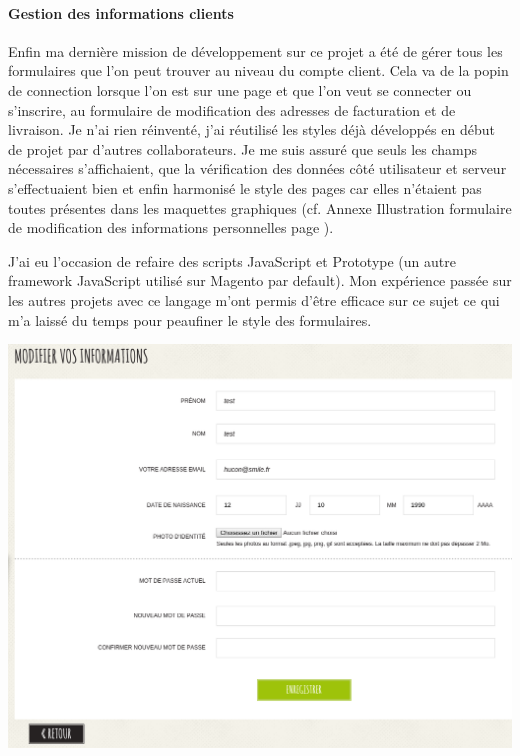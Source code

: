 \documentclass[a4paper,11pt,twoside]{report}
\begin{document}
	\label{SL_method_to_select_CMS_block}
	
    	\paragraph*{Gestion des informations clients}
    	Enfin ma dernière mission de développement sur ce projet a été de gérer tous les formulaires que l'on peut trouver au niveau du compte client. Cela va de la popin de connection lorsque l'on est sur une page et que l'on veut se connecter ou s'inscrire, au formulaire de modification des adresses de facturation et de livraison. Je n'ai rien réinventé, j'ai réutilisé les styles déjà développés en début de projet par d'autres collaborateurs. Je me suis assuré que seuls les champs nécessaires s'affichaient, que la vérification des données côté utilisateur et serveur s'effectuaient bien et enfin harmonisé le style des pages car elles n'étaient pas toutes présentes dans les maquettes graphiques (cf. Annexe Illustration formulaire de modification des informations personnelles page \pageref{SL_account_information_form}).
	
	J'ai eu l'occasion de refaire des scripts JavaScript et Prototype (un autre framework JavaScript utilisé sur Magento par default). Mon expérience passée sur les autres projets avec ce langage m'ont permis d'être efficace sur ce sujet ce qui m'a laissé du temps pour peaufiner le style des formulaires. 
	
	\begin{center}
	  \includegraphics[width=\textwidth]{images/SL_account_information_form.png} 
	  \label{SL_account_information_form}
	\end{center}
\end{document}
